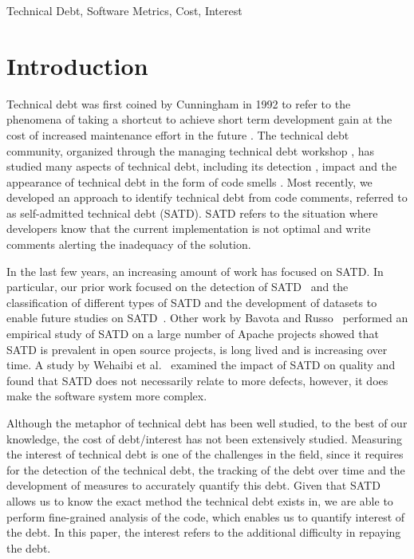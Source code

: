 \documentclass[10pt, conference]{IEEEtran}
\begin{document}
\begin{IEEEkeywords}
Technical Debt, Software Metrics, Cost, Interest
\end{IEEEkeywords}

\IEEEpeerreviewmaketitle

\section{Introduction}
Technical debt was first coined by Cunningham in 1992 to refer to the phenomena of taking a shortcut to achieve short term development gain at the cost of increased maintenance effort in the future \cite{Cunningham1992WPM}. The technical debt community, organized through the managing technical debt workshop \cite{MTD2016}, has studied many aspects of technical debt, including its detection \cite{Zazworka2013EASE}, impact \cite{Zazworka2011MTD} and the appearance of technical debt in the form of code smells \cite{Fontana2012MTD}. Most recently, we developed an approach to identify technical debt from code comments, referred to as self-admitted technical debt (SATD). SATD refers to the situation where developers know that the current implementation is not optimal and write comments alerting the inadequacy of the solution. 


In the last few years, an increasing amount of work has focused on SATD. In particular, our prior work focused on the detection of SATD~\cite{Potdar2014ICSME,Maldonado_TSE2017} and the classification of different types of SATD and the development of datasets to enable future studies on SATD~\cite{Maldonado2015MTD}. Other work by Bavota and Russo~\cite{Bavota2016MSR} performed an empirical study of SATD on a large number of Apache projects showed that SATD is prevalent in open source projects, is long lived and is increasing over time. A study by Wehaibi et al.~\cite{Wehaibi2016SANER} examined the impact of SATD on quality and found that SATD does not necessarily relate to more defects, however, it does make the software system more complex. 

Although the metaphor of technical debt has been well studied, to the best of our knowledge, the cost of debt/interest has not been extensively studied. Measuring the interest of technical debt is one of the challenges in the field, since it requires for the detection of the technical debt, the tracking of the debt over time and the development of measures to accurately quantify this debt. Given that SATD allows us to know the exact method the technical debt exists in, we are able to perform fine-grained analysis of the code, which enables us to quantify interest of the debt. In this paper, the interest refers to the additional difficulty in repaying the debt.
\end{document}
